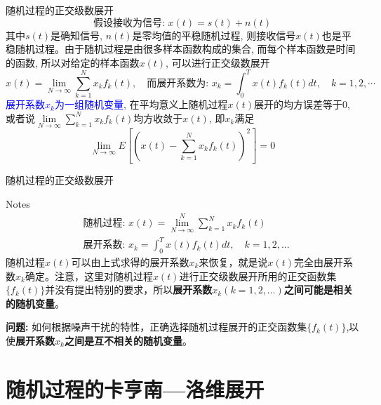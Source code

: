\begin{frame}[shrink]{随机过程的正交级数展开}
\[\text{假设接收为信号: } x(t)=s(t)+n(t)\]
其中$s(t)$是确知信号, $n(t)$是零均值的平稳随机过程, 则接收信号$x(t)$也是平稳随机过程。由于随机过程是由很多样本函数构成的集合, 而每个样本函数是时间的函数, 所以对给定的样本函数$x(t)$, 可以进行正交级数展开
\[x(t)=\lim\limits_{N\to\infty}\sum_{k=1}^{N}x_kf_k(t), \quad \text{而展开系数为: }x_k=\int_{0}^{T}x(t)f_k(t)dt,\quad k=1,2,\cdots \]
\textcolor{blue}{展开系数$x_k$为一组随机变量}, 在平均意义上随机过程$x(t)$展开的均方误差等于0,或者说$\lim\limits_{N\to\infty}\sum\limits_{k=1}^{N}x_kf_k(t)$均方收敛于$x(t)$, 即$x_k$满足
\[\lim\limits_{N\to\infty}E\left[\left(x(t)-\sum_{k=1}^{N}x_kf_k(t)\right)^2 \right]=0 \]
\end{frame}

\begin{frame}{随机过程的正交级数展开}
\begin{block}{Notes}
\begin{align*}
&\textbf{随机过程: } x(t)=\lim\limits_{N\to\infty}^N\sum\limits_{k=1}^Nx_kf_k(t)\\
&\textbf{展开系数: } x_k=\int_{0}^{T}x(t)f_k(t)dt,\quad k=1,2,\dots
\end{align*}
随机过程$x(t)$可以由上式求得的展开系数$x_k$来恢复，就是说$x(t)$完全由展开系数$x_k$确定。注意，这里对随机过程$x(t)$进行正交级数展开所用的正交函数集$\{f_k(t)\}$并没有提出特别的要求，所以\textbf{展开系数$x_k(k=1,2,\dots)$之间可能是相关的随机变量}。\\
\end{block}
\textbf{问题:} 如何根据噪声干扰的特性，正确选择随机过程展开的正交函数集$\{f_k(t)\}$,以使\textbf{展开系数$x_k$之间是互不相关的随机变量}。
\end{frame}

\section{随机过程的卡亨南---洛维展开}

